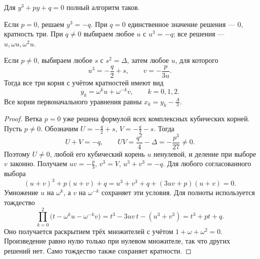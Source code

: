 \begin{theorem}\label{thm:legacy-c23-11}
Для \(y^3+py+q=0\) полный алгоритм таков.

Если \(p=0\), решаем \(y^3=-q\). При \(q=0\) единственное значение решения --- \(0\), кратность три. При \(q\ne0\) выбираем любое \(u\) с \(u^3=-q\); все решения --- \(u,\omega u,\omega^2u\).

Если \(p\ne0\), выбираем любое \(s\) с \(s^2=\Delta\), затем любое \(u\), для которого
\[
u^3=-\frac q2+s,
\qquad v=-\frac p{3u}.
\]
Тогда все три корня с учётом кратностей имеют вид
\[
y_k=\omega^ku+\omega^{-k}v,\qquad k=0,1,2.
\]
Все корни первоначального уравнения равны \(x_k=y_k-\frac A3\).
\end{theorem}
\begin{proof}
Ветка \(p=0\) уже решена формулой всех комплексных кубических корней. Пусть \(p\ne0\). Обозначим \(U=-\frac q2+s\), \(V=-\frac q2-s\). Тогда
\[
U+V=-q,\qquad UV=\frac{q^2}{4}-\Delta=-\frac{p^3}{27}\ne0.
\]
Поэтому \(U\ne0\), любой его кубический корень \(u\) ненулевой, и деление при выборе \(v\) законно. Получаем \(uv=-\frac p3\), \(v^3=V\), \(u^3+v^3=-q\). Для любого согласованного выбора
\[
(u+v)^3+p(u+v)+q
=u^3+v^3+q+(3uv+p)(u+v)=0.
\]
Умножение \(u\) на \(\omega^k\), а \(v\) на \(\omega^{-k}\) сохраняет эти условия. Для полноты используется тождество
\[
\prod_{k=0}^{2}\bigl(t-\omega^ku-\omega^{-k}v\bigr)
=t^3-3uv\,t-(u^3+v^3)=t^3+pt+q.
\]
Оно получается раскрытием трёх множителей с учётом \(1+\omega+\omega^2=0\). Произведение равно нулю только при нулевом множителе, так что других решений нет. Само тождество также сохраняет кратности.
\end{proof}

